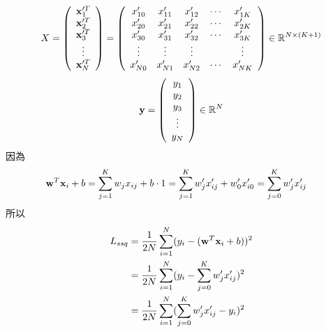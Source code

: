 \documentclass{article}
\begin{document}
\begin{align*}
    X =
    \left(
    \begin{array}{c}
        {\bf x}_1^{\prime T}\\
        {\bf x}_2^{\prime T}\\
        {\bf x}_3^{\prime T}\\
        \vdots\\
        {\bf x}_N^{\prime T}\\
    \end{array}
    \right) =
    \left(
    \begin{array}{ccccc}
        x_{10}^\prime & x_{11}^\prime & x_{12}^\prime & \cdots & x_{1K}^\prime\\
        x_{20}^\prime & x_{21}^\prime & x_{22}^\prime & \cdots & x_{2K}^\prime\\
        x_{30}^\prime & x_{31}^\prime & x_{32}^\prime & \cdots & x_{3K}^\prime\\
        \vdots & \vdots & \vdots & \ & \vdots\\
        x_{N0}^\prime & x_{N1}^\prime & x_{N2}^\prime & \cdots & x_{NK}^\prime
    \end{array}
    \right)
    \in {\mathbb R}^{N \times (K + 1)}
\end{align*}
\begin{align*}
    {\bf y} =
    \left(
    \begin{array}{c}
        y_1\\
        y_2\\
        y_3\\
        \vdots\\
        y_N
    \end{array}
    \right)
    \in {\mathbb R}^N
\end{align*}
因為
\begin{align*}
    {\bf w}^T{\bf x}_i + b &= \sum_{j = 1}^{K} w_j x_{ij} + b \cdot 1 = \sum_{j = 1}^{K} w_j^\prime x_{ij}^\prime + w_0^\prime x_{i0}^\prime = \sum_{j = 0}^{K} w_j^\prime x_{ij}^\prime
\end{align*}
所以
\begin{align*}
    L_{ssq} &= \frac{1}{2N} \sum_{i = 1}^{N} (y_i - ({\bf w}^T {\bf x}_i + b))^2\\
    &= \frac{1}{2N} \sum_{i = 1}^{N} (y_i - \sum_{j = 0}^{K} w_j^\prime x_{ij}^\prime)^2\\
    &= \frac{1}{2N} \sum_{i = 1}^{N} (\sum_{j = 0}^{K} w_j^\prime x_{ij}^\prime - y_i)^2\\
\end{align*}
\end{document}
